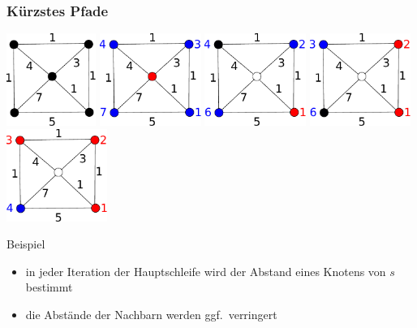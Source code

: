 \documentclass[aspectratio=1610, 11pt]{beamer}
\newcommand{\mytitle}{K\"urzstes Pfade}
\begin{document}
\begin{frame}\frametitle{\mytitle}
	\begin{overprint}
		 \hfill\includegraphics[height=30mm]{images/dij1.pdf}	
		\onslide<2> \hfill\includegraphics[height=30mm]{images/dij2.pdf}	
		\onslide<3> \hfill\includegraphics[height=30mm]{images/dij3.pdf}	
		\onslide<4> \hfill\includegraphics[height=30mm]{images/dij4.pdf}	
		\onslide<5> \hfill\includegraphics[height=30mm]{images/dij5.pdf}	
	\end{overprint}
	\begin{exampleblock}{Beispiel}
		\begin{itemize}
			\item in jeder Iteration der Hauptschleife wird der Abstand eines Knotens von $s$ bestimmt
			\item die Abst\"ande der Nachbarn werden ggf.\ verringert
		\end{itemize}
		\end{exampleblock}
\end{frame}
\end{document}
